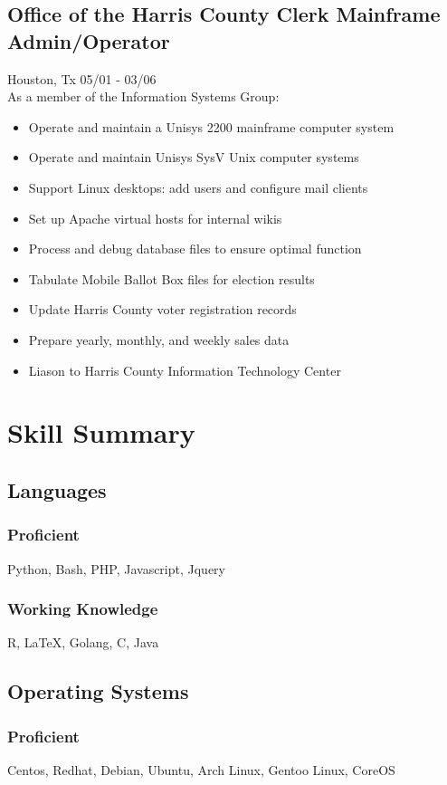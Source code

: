 \documentclass{article}
\begin{document}
  \subsection{Office of the Harris County Clerk \hfill Mainframe Admin/Operator}
  Houston, Tx \hfill 05/01 - 03/06\\
  As a member of the Information Systems Group:\\
  \begin{itemize}
  \item Operate and maintain a Unisys 2200 mainframe computer system
  \item Operate and maintain Unisys SysV Unix computer systems
  \item Support Linux desktops: add users and configure mail clients
  \item Set up Apache virtual hosts for internal wikis
  \item Process and debug database files to ensure optimal function
  \item Tabulate Mobile Ballot Box files for election results
  \item Update Harris County voter registration records
  \item Prepare yearly, monthly, and weekly sales data
  \item Liason to Harris County Information Technology Center
  \end{itemize}

\section{Skill Summary}
  \subsection{Languages}
    \subsubsection{Proficient}
    Python, Bash, PHP, Javascript, Jquery
    \subsubsection{Working Knowledge}
    R, {\LaTeX}, Golang, C, Java

  \subsection{Operating Systems}
    \subsubsection{Proficient}
    Centos, Redhat, Debian, Ubuntu, Arch Linux, Gentoo Linux, CoreOS
\end{document}
